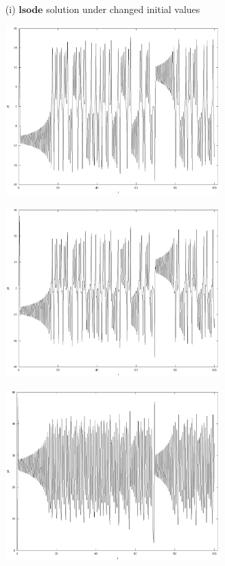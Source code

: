 \documentclass[11pt,a4paper]{article}
\begin{document}
\begin{enumerate}
	\pagebreak
	
	\begin{enumerate}
	\item[(i)] $\textbf{lsode}$ solution under changed initial values
	\begin{center}
		\includegraphics[width=0.65\textwidth]{y1s.eps}
	\end{center}
	\begin{center}
		\includegraphics[width=0.65\textwidth]{y2s.eps}
	\end{center}
	\begin{center}
		\includegraphics[width=0.65\textwidth]{y3s.eps}
	\end{center}
	\pagebreak
	

\end{enumerate}
\end{enumerate}
\end{document}
